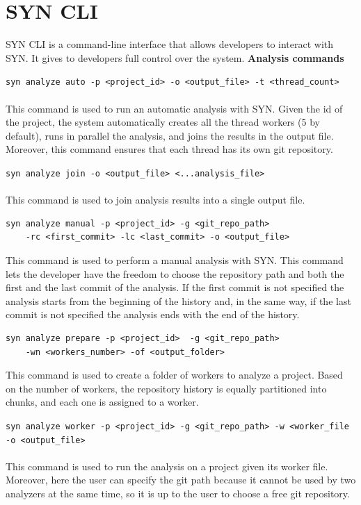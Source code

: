 \section{SYN CLI}
SYN CLI is a command-line interface that allows developers to interact with SYN. It gives to developers full control over the system.
\bigbreak
\textbf{Analysis commands}
\bigbreak

\lstinline{syn analyze auto -p <project_id> -o <output_file> -t <thread_count>}\\
\\
This command is used to run an automatic analysis with SYN. 
Given the id of the project, the system automatically creates all the thread workers (5 by default), runs in parallel the analysis, and joins the results in the output file. 
Moreover, this command ensures that each thread has its own git repository. 
\bigbreak

\lstinline{syn analyze join -o <output_file> <...analysis_file>}\\
\\
This command is used to join analysis results into a single output file.
\bigbreak
\begin{lstlisting}
syn analyze manual -p <project_id> -g <git_repo_path>
    -rc <first_commit> -lc <last_commit> -o <output_file>
\end{lstlisting}
\bigbreak
This command is used to perform a manual analysis with SYN. This command lets the developer have the freedom to choose the repository path and both the first and the last commit of the analysis. 
If the first commit is not specified the analysis starts from the beginning of the history and, in the same way, if the last commit is not specified the analysis ends with the end of the history. 
\bigbreak

\begin{lstlisting}
syn analyze prepare -p <project_id>  -g <git_repo_path> 
    -wn <workers_number> -of <output_folder>
\end{lstlisting}
\bigbreak
This command is used to create a folder of workers to analyze a project.
Based on the number of workers, the repository history is equally partitioned into chunks, and each one is assigned to a worker. 
\bigbreak

\lstinline{syn analyze worker -p <project_id> -g <git_repo_path> -w <worker_file -o <output_file>}\\
\\
This command is used to run the analysis on a project given its worker file. 
Moreover, here the user can specify the git path because it cannot be used by two analyzers at the same time, so it is up to the user to choose a free git repository. 

